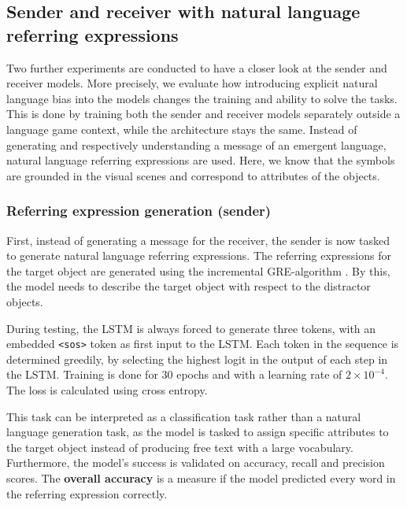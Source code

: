 \documentclass[11pt,a4paper]{article}
\begin{document}
\subsection{Sender and receiver with natural language referring expressions}
Two further experiments are conducted to have a closer look at the sender and receiver models.
More precisely, we evaluate how introducing explicit natural language bias into the models changes the training and ability to solve the tasks.
This is done by training both the sender and receiver models separately outside a language game context, while the architecture stays the same.
Instead of generating and respectively understanding a message of an emergent language, natural language referring expressions are used.
Here, we know that the symbols are grounded in the visual scenes and correspond to attributes of the objects.

\subsubsection{Referring expression generation (sender)}
First, instead of generating a message for the receiver, the sender is now tasked to generate natural language referring expressions.
The referring expressions for the target object are generated using the incremental GRE-algorithm \citep{Dale1995}. %
By this, the model needs to describe the target object with respect to the distractor objects.


During testing, the LSTM is always forced to generate three tokens, with an embedded \texttt{<sos>} token as first input to the LSTM.
Each token in the sequence is determined greedily, by selecting the highest logit in the output of each step in the LSTM.
Training is done for 30 epochs and with a learning rate of $2\times10^{-4}$.
The loss is calculated using cross entropy.

This task can be interpreted as a classification task rather than a natural language generation task, as the model is tasked to assign specific attributes to the target object instead of producing free text with a large vocabulary.
Furthermore, the model's success is validated on accuracy, recall and precision scores.
The \textbf{overall accuracy} is a measure if the model predicted every word in the referring expression correctly.
\end{document}
